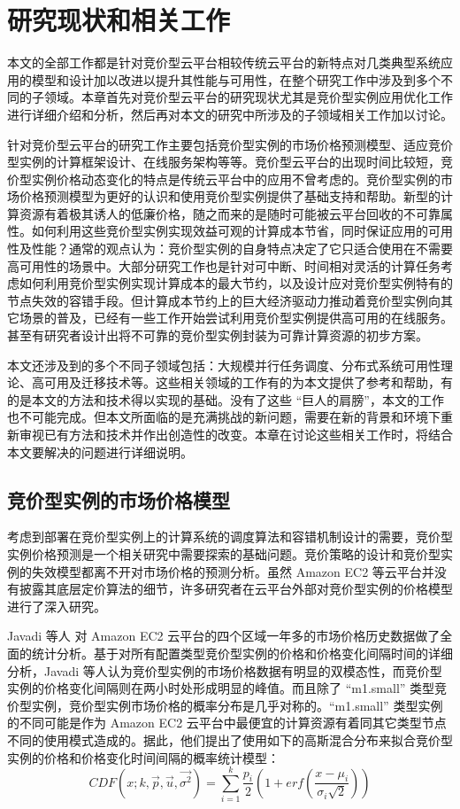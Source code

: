 \chapter{研究现状和相关工作}
\label{cha:background}

本文的全部工作都是针对竞价型云平台相较传统云平台的新特点对几类典型系统应用的模型和设计加以改进以提升其性能与可用性，在整个研究工作中涉及到多个不同的子领域。本章首先对竞价型云平台的研究现状尤其是竞价型实例应用优化工作进行详细介绍和分析，然后再对本文的研究中所涉及的子领域相关工作加以讨论。

针对竞价型云平台的研究工作主要包括竞价型实例的市场价格预测模型、适应竞价型实例的计算框架设计、在线服务架构等等。竞价型云平台的出现时间比较短，竞价型实例价格动态变化的特点是传统云平台中的应用不曾考虑的。竞价型实例的市场价格预测模型为更好的认识和使用竞价型实例提供了基础支持和帮助。新型的计算资源有着极其诱人的低廉价格，随之而来的是随时可能被云平台回收的不可靠属性。如何利用这些竞价型实例实现效益可观的计算成本节省，同时保证应用的可用性及性能？通常的观点认为：竞价型实例的自身特点决定了它只适合使用在不需要高可用性的场景中。大部分研究工作也是针对可中断、时间相对灵活的计算任务考虑如何利用竞价型实例实现计算成本的最大节约，以及设计应对竞价型实例特有的节点失效的容错手段。但计算成本节约上的巨大经济驱动力推动着竞价型实例向其它场景的普及，已经有一些工作开始尝试利用竞价型实例提供高可用的在线服务。甚至有研究者设计出将不可靠的竞价型实例封装为可靠计算资源的初步方案。

本文还涉及到的多个不同子领域包括：大规模并行任务调度、分布式系统可用性理论、高可用及迁移技术等。这些相关领域的工作有的为本文提供了参考和帮助，有的是本文的方法和技术得以实现的基础。没有了这些 ``巨人的肩膀''，本文的工作也不可能完成。但本文所面临的是充满挑战的新问题，需要在新的背景和环境下重新审视已有方法和技术并作出创造性的改变。本章在讨论这些相关工作时，将结合本文要解决的问题进行详细说明。

\section{竞价型实例的市场价格模型}
考虑到部署在竞价型实例上的计算系统的调度算法和容错机制设计的需要，竞价型实例价格预测是一个相关研究中需要探索的基础问题。竞价策略的设计和竞价型实例的失效模型都离不开对市场价格的预测分析。虽然 Amazon EC2 等云平台并没有披露其底层定价算法的细节，许多研究者在云平台外部对竞价型实例的价格模型进行了深入研究。

Javadi 等人 \cite{Javadi:2011:SMS:2120969.2121740} 对 Amazon EC2 云平台的四个区域一年多的市场价格历史数据做了全面的统计分析。基于对所有配置类型竞价型实例的价格和价格变化间隔时间的详细分析，Javadi 等人认为竞价型实例的市场价格数据有明显的双模态性，而竞价型实例的价格变化间隔则在两小时处形成明显的峰值。而且除了 ``m1.small'' 类型竞价型实例，竞价型实例市场价格的概率分布是几乎对称的。``m1.small'' 类型实例的不同可能是作为 Amazon EC2 云平台中最便宜的计算资源有着同其它类型节点不同的使用模式造成的。据此，他们提出了使用如下的高斯混合分布来拟合竞价型实例的价格和价格变化时间间隔的概率统计模型：
\begin{equation}\label{eq_mog}\nonumber 
CDF(x; k, \vec p, \vec u, \vec{\sigma^2}) = \sum_{i=1}^{k}{\frac{p_i}{2}(1+erf(\frac{x-\mu_i}{\sigma_i\sqrt{2}}))}
\end{equation}

